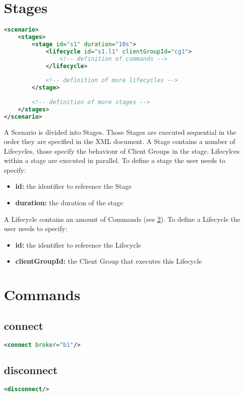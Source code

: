 \section{Stages}
\begin{lstlisting}[caption={XMl definition of Stages}, captionpos=b, label={lst:stages}, language=XML]
<scenario>
	<stages>
		<stage id="s1" duration="10s">
			<lifecycle id="s1.l1" clientGroupId="cg1">
				<!-- definition of commands -->
			</lifecycle>
	
			<!-- definition of more lifecycles -->
		</stage>
	
		<!-- definition of more stages -->
	</stages>
</scenario>
\end{lstlisting}
A Scenario is divided into Stages.
Those Stages are executed sequential in the order they are specified in the XML document.
A Stage contains a number of Lifecycles, those specify the behaviour of Client Groups in the stage.
Lifecylces within a stage are executed in parallel.
To define a stage the user needs to specify:
\begin{itemize}
	\item \textbf{id:} the identifier to reference the Stage
	\item \textbf{duration:} the duration of the stage %
\end{itemize}
A Lifecycle contains an amount of Commands (see \ref{sec:commands}). To define a Lifecycle the user needs to specify:
\begin{itemize}
	\item \textbf{id:} the identifier to reference the Lifecycle
	\item \textbf{clientGroupId:} the Client Group that executes this Lifecycle
\end{itemize}

\section{Commands}\label{sec:commands}
\subsection{connect}
\begin{lstlisting}[caption={XMl definition of a connect command}, captionpos=b, label={lst:connect}, language=XML]
<connect broker="b1"/>
\end{lstlisting}
\subsection{disconnect}
\begin{lstlisting}[caption={XMl definition of a disconnect command}, captionpos=b, label={lst:disconnect}, language=XML]
<disconnect/>
\end{lstlisting}
